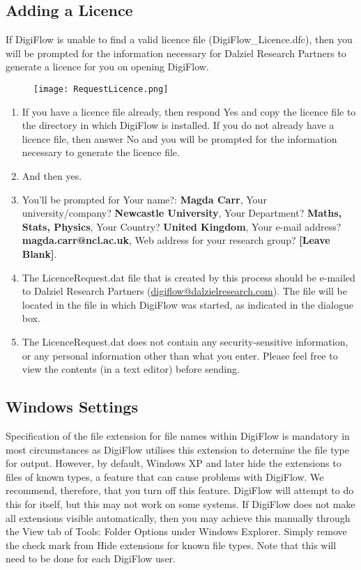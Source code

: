 \documentclass{article}
\newcommand{\Analyse}[1]{\textcolor{mygreen}{#1}}
\newcommand{\Files}[1]{\textcolor{myblue}{#1}}
\begin{document}
\subsection{Adding a Licence}
If DigiFlow is unable to find a valid licence file (\Files{DigiFlow\_Licence.dfc}), then you will be prompted for the information necessary for Dalziel Research Partners to generate a licence for you on opening DigiFlow. 
\begin{figure}
    \texttt{[image: RequestLicence.png]}
\end{figure}
\begin{enumerate}
    \item If you have a licence file already, then respond \Analyse{Yes} and copy the licence file to the directory in which DigiFlow is installed. If you do not already have a licence file, then answer \Analyse{No} and you will be prompted for the information necessary to generate the licence file. 
    \item And then yes. 
    \item You'll be prompted for Your name?: \textbf{Magda Carr}, Your university/company? \textbf{Newcastle University}, Your Department? \textbf{Maths, Stats, Physics}, Your Country? \textbf{United Kingdom}, Your e-mail address? \textbf{magda.carr@ncl.ac.uk}, Web address for your research group? \textbf{[Leave Blank]}. 
    \item The \Files{LicenceRequest.dat} file that is created by this process should be e-mailed to Dalziel Research Partners (\url{digiflow@dalzielresearch.com}). The file will be located in the file in which DigiFlow was started, as indicated in the dialogue box.
    \item The \Files{LicenceRequest.dat} does not contain any security-sensitive information, or any personal information other than what you enter. Please feel free to view the contents (in a text editor) before sending. 
\end{enumerate}

\subsection{Windows Settings}
Specification of the file extension for file names within DigiFlow is mandatory in most circumstances as DigiFlow utilises this extension to determine the file type for output. However, by default, Windows XP and later hide the extensions to files of known types, a feature that can cause problems with DigiFlow. We recommend, therefore, that you turn off this feature. DigiFlow will attempt to do this for itself, but this may not work on some systems. If DigiFlow does not make all extensions visible automatically, then you may achieve this manually through the \Analyse{View} tab of \Analyse{Tools: Folder Options} under \Analyse{Windows Explorer}. Simply remove the check mark from \Analyse{Hide extensions for known file types}. Note that this will need to be done for each DigiFlow user.
\end{document}
